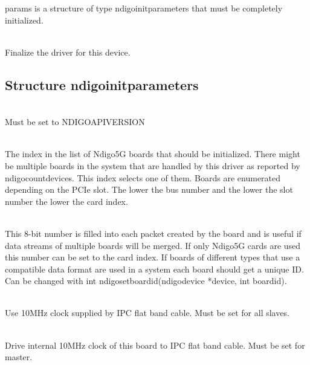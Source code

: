         \textsf{params} is a structure of type \textsf{ndigo\tu init\tu parameters} that must be completely initialized.\par

        \\
        Finalize the driver for this device.

        \subsection{Structure ndigo\tu init\tu parameters}

            \\
            Must be set to \textsf{NDIGO\tu API\tu VERSION}\par

            \\
            The index in the list of Ndigo5G boards that should be initialized. There might be multiple boards in the system that are handled by this driver as reported by \textsf{ndigo\tu count\tu devices}. This index selects one of them. Boards are enumerated depending on the PCIe slot. The lower the bus number and the lower the slot number the lower the card index.\par

            \\
            This 8-bit number is filled into each packet created by the board and is useful if data streams of multiple boards will be merged. If only Ndigo5G cards are used this number can be set to the card index. If boards of different types that use a compatible data format are used in a system each board should get a unique ID. Can be changed with \textsf{int ndigo\tu set\tu board\tu id(ndigo\tu device *device, int board\tu id)}.\par

            \\
            Use 10MHz clock supplied by IPC flat band cable. Must be set for all slaves.\par

            \\
            Drive internal 10MHz clock of this board to IPC flat band cable. Must be set for master.\par

